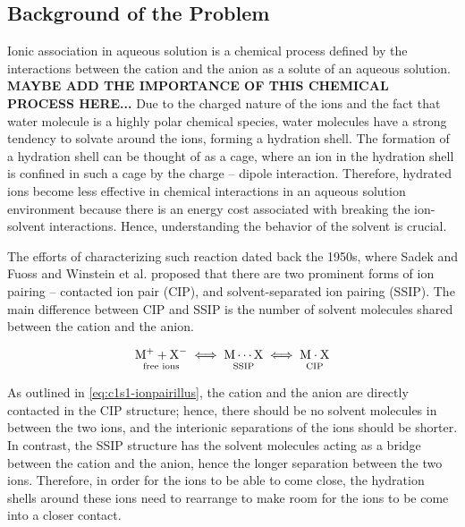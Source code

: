 \begin{spacing}{2.0}

    \section{Background of the Problem}

    Ionic association in aqueous solution is a chemical process defined by the interactions between the cation and the anion as a solute of an 
    aqueous solution. \textbf{MAYBE ADD THE IMPORTANCE OF THIS CHEMICAL PROCESS HERE...} Due to the charged nature of the ions and the fact that 
    water molecule is a highly polar chemical species, water molecules have a strong tendency to solvate around the ions, forming a hydration 
    shell. The formation of a hydration shell can be thought of as a cage, where an ion in the hydration shell is confined in such a cage by 
    the charge – dipole interaction. Therefore, hydrated ions become less effective in chemical interactions in an aqueous solution environment 
    because there is an energy cost associated with breaking the ion-solvent interactions. Hence, understanding the behavior of the solvent is 
    crucial.

    The efforts of characterizing such reaction dated back the 1950s, where Sadek and Fuoss \cite{P-JACS-1954-v76-Sadek} and Winstein et al. 
    \cite{P-JACS-1956-v78-Winstein} proposed that there are two prominent forms of ion pairing – contacted ion pair (CIP), and solvent-separated 
    ion pairing (SSIP). The main difference between CIP and SSIP is the number of solvent molecules shared between the cation and the anion.

    \begin{equation}
        \underset{\text{free ions}}{\mathrm{M}^+ + \mathrm{X}^-\vphantom{p}} \iff 
        \underset{\text{SSIP}}{\mathrm{M} \cdots \mathrm{X}\vphantom{p}} \iff 
        \underset{\text{CIP}}{\mathrm{M} \cdot \mathrm{X}\vphantom{p}}
        \label{eq:c1s1-ionpairillus}
    \end{equation}

    As outlined in \ref{eq:c1s1-ionpairillus}, the cation and the anion are directly contacted in the CIP structure; hence, there should be
    no solvent molecules in between the two ions, and the interionic separations of the ions should be shorter. In contrast, the SSIP structure
    has the solvent molecules acting as a bridge between the cation and the anion, hence the longer separation between the two ions. Therefore,
    in order for the ions to be able to come close, the hydration shells around these ions need to rearrange to make room for the ions to
    be come into a closer contact.

\end{spacing}
